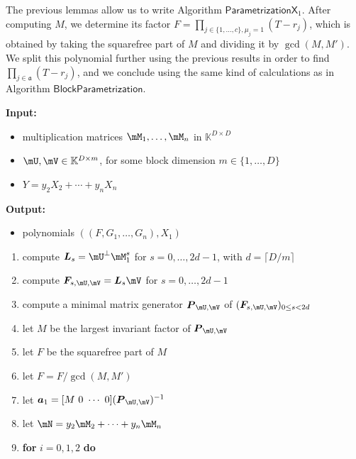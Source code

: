 \documentclass[12pt]{article}
\newcommand{\mat}[1]{\bm{\MakeUppercase{#1}}} %
\newcommand{\row}[1]{\bm{\MakeLowercase{#1}}} %
\newcommand{\seqelt}[1]{\bm{F}_{#1}} %
\newcommand{\mainalgoname}{\mathsf{ BlockParametrization}}
\newcommand{\mf}{Y}
\def\K{\mathbb{K}}
\def\K {\ensuremath{\mathbb{K}}}
\begin{document}
The previous lemmas allow us to write Algorithm
$\mathsf{ParametrizationX}_1$. After computing $M$, we determine its
factor $F=\prod_{j \in \{1,\dots,c\}, \mu_j=1} (T-r_j)$, which is
obtained by taking the squarefree part of $M$ and dividing it by
$\gcd(M,M')$. We split this polynomial further using the previous
results in order to find $\prod_{j \in \mathfrak{a}} (T-r_j)$, and we
conclude using the same kind of calculations as in Algorithm
$\mainalgoname$.

\begin{algorithm}[H]
	\caption{$\mainalgoname{\sf X}_1(\mM_1,\dots,\mM_n,\mU,\mV,\mf$)}
	{\bf Input:} \vspace{-0.5em}
	\begin{itemize}
		\item multiplication matrices $\mM_1,\dots,\mM_n$ in $\K^{D \times D}$
		\item  $\mU,\mV \in \mathbb{K}^{D \times m}$, for some block dimension  $m \in \{1,\dots,D\}$
                \item $\mf =y_2 X_2 + \cdots + y_n X_n$
	\end{itemize}
	{\bf Output:}  \vspace{-0.5em}
        \begin{itemize}
        \item polynomials $((F,G_1,\dots,G_n),X_1)$
        \end{itemize}
  \begin{enumerate}
  \item\label{X1step3} { compute $\mat{L}_s = \mU^{\perp}\mM_1^s$ for $s=0,\dots,2d-1$, with $d = \lceil D/m \rceil$}
  \item\label{X1step4} { compute $\seqelt{s,\mU,\mV}= \mat{L}_s\mV$ for $s=0,\dots, 2d-1$}
  \item\label{X1step5} { compute a minimal matrix generator $\mat{P}_{\mU,\mV}$ of $(\seqelt{s,\mU,\mV})_{0 \le s < 2d}$}
  \item\label{X1step6} { let $M$ be the largest invariant factor of $\mat{P}_{\mU,\mV}$}
  \item\label{X1step7} { let $F$ be  the squarefree part  of $M$}
  \item\label{X1step7b} let $F = F /\gcd(M, M')$
  \item\label{X1step8} { let $\row{a}_1 = [M~0 ~\cdots~ 0] (\mat{P}_{\mU,\mV})^{-1}$}
  \item let $\mN = y_2 \mM_2 + \cdots+y_n \mM_n$
  \item \textbf{for} $i=0,1,2$ \textbf{do}
    \begin{enumerate}

\end{enumerate}
\end{enumerate}
\end{algorithm}
\end{document}
